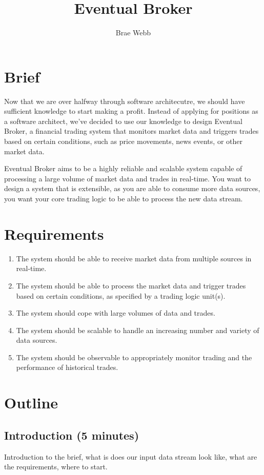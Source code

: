 \documentclass{csse4400}
\title{Eventual Broker}
\author{Brae Webb}
\date{\week[tutorial]{7}}
\begin{document}
\maketitle

\section{Brief}

Now that we are over halfway through software architecutre,
we should have sufficient knowledge to start making a profit.
Instead of applying for positions as a software architect,
we've decided to use our knowledge to design 
Eventual Broker,
a financial trading system that monitors market data and triggers trades based on certain conditions,
such as price movements, news events, or other market data.

Eventual Broker aims to be a highly reliable and scalable system capable of processing a large volume of market data and trades in real-time.
You want to design a system that is extensible,
as you are able to consume more data sources,
you want your core trading logic to be able to process the new data stream.

\section{Requirements}

\begin{enumerate}
\item The system should be able to receive market data from multiple sources in real-time.
\item The system should be able to process the market data and trigger trades based on certain conditions, as specified by a trading logic unit(s).
\item The system should cope with large volumes of data and trades.
\item The system should be scalable to handle an increasing number and variety of data sources.
\item The system should be observable to appropriately monitor trading and the performance of historical trades.
\end{enumerate}

\section{Outline}

\subsection*{Introduction (5 minutes)}
Introduction to the brief,
what is does our input data stream look like,
what are the requirements,
where to start.
\end{document}
